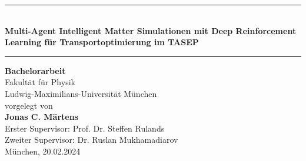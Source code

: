 \graphicspath{{img/}}

\begin{titlepage}
    \begin{center}        
        \huge
        \vspace*{0.65cm}
        \rule{\linewidth}{0.3ex}\\
        \vspace*{0.3cm}
        \textbf{Multi-Agent Intelligent Matter Simulationen mit Deep Reinforcement Learning für Transportoptimierung im TASEP}\\
        \rule{\linewidth}{0.3ex}
        \vspace*{4cm}

        \Large
       \textbf{Bachelorarbeit}\\
        \vspace*{0.1cm}
        Fakultät für Physik\\
        \vspace*{0.1cm}
        Ludwig-Maximilians-Universität München\\
        \vspace*{3.5cm}
        \large
        vorgelegt von\\
        \vspace*{0.2cm}
        \Large \textbf{Jonas C. Märtens}\\
        \vspace*{0.6cm}
        \large
        Erster Supervisor: Prof. Dr. Steffen Rulands\\
        Zweiter Supervisor: Dr. Ruslan Mukhamadiarov\\
        \vspace*{2.9cm}
        München, 20.02.2024\\
    \end{center}
\end{titlepage}


%
%
\clearpage{\pagestyle{empty}\cleardoublepage}
%



\cleardoublepage

\tableofcontents
\cleardoublepage
{}
\setcounter{page}{1}